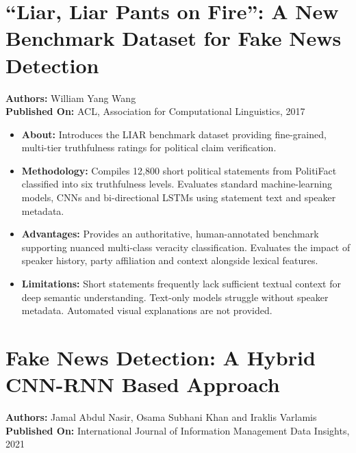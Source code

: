 \documentclass[12pt,a4paper,oneside]{report}
\begin{document}
\section{``Liar, Liar Pants on Fire'': A New Benchmark Dataset for Fake News Detection}
\textbf{Authors:} William Yang Wang\\
\textbf{Published On:} ACL, Association for Computational Linguistics, 2017

\begin{itemize}[leftmargin=*, itemsep=2pt]
  \item \textbf{About:} Introduces the LIAR benchmark dataset providing fine-grained,
        multi-tier truthfulness ratings for political claim verification.
  \item \textbf{Methodology:} Compiles 12,800 short political statements from PolitiFact
        classified into six truthfulness levels. Evaluates standard machine-learning
        models, CNNs and bi-directional LSTMs using statement text and speaker metadata.
  \item \textbf{Advantages:} Provides an authoritative, human-annotated benchmark
        supporting nuanced multi-class veracity classification. Evaluates the impact of
        speaker history, party affiliation and context alongside lexical features.
  \item \textbf{Limitations:} Short statements frequently lack sufficient textual context
        for deep semantic understanding. Text-only models struggle without speaker
        metadata. Automated visual explanations are not provided.
\end{itemize}

\section{Fake News Detection: A Hybrid CNN-RNN Based Approach}
\textbf{Authors:} Jamal Abdul Nasir, Osama Subhani Khan and Iraklis Varlamis\\
\textbf{Published On:} International Journal of Information Management Data Insights, 2021
\end{document}
